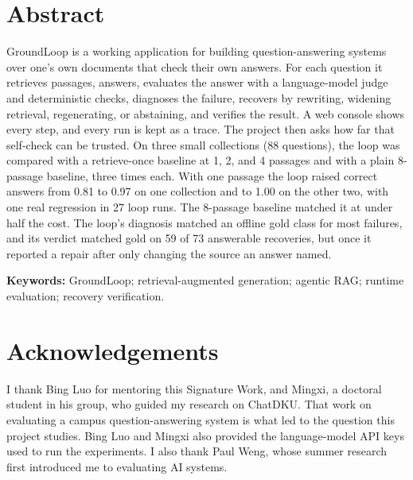 \documentclass[12pt, a4paper, oneside]{report}
\begin{document}
\doublespacing %


\chapter*{Abstract}


GroundLoop is a working application for building question-answering systems
over one's own documents that check their own answers. For each question
it retrieves passages, answers, evaluates the answer with a language-model
judge and deterministic checks, diagnoses the failure, recovers by
rewriting, widening retrieval, regenerating, or abstaining, and verifies
the result. A web console shows every step, and every run is kept as a
trace. The project then asks how far that self-check can be trusted. On
three small collections (88 questions), the loop was compared with a
retrieve-once baseline at 1, 2, and 4 passages and with a plain 8-passage
baseline, three times each. With one passage the loop raised correct
answers from 0.81 to 0.97 on one collection and to 1.00 on the other two,
with one real regression in 27 loop runs. The 8-passage baseline matched it
at under half the cost. The loop's diagnosis matched an offline gold class
for most failures, and its verdict matched gold on 59 of 73 answerable
recoveries, but once it reported a repair after only changing the source
an answer named.

\textbf{Keywords:} GroundLoop; retrieval-augmented generation; agentic
RAG; runtime evaluation; recovery verification.

\vspace{4\bigskipamount}



\chapter*{Acknowledgements}
\label{acknowledgements}

I thank Bing Luo for mentoring this Signature Work, and Mingxi, a doctoral
student in his group, who guided my research on ChatDKU. That work on
evaluating a campus question-answering system is what led to the question
this project studies. Bing Luo and Mingxi also provided the language-model
API keys used to run the experiments. I also thank Paul Weng, whose summer research
first introduced me to evaluating AI systems.
\end{document}
